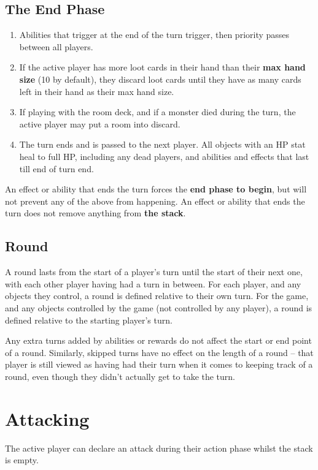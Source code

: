 \documentclass[a4paper, twoside]{report} %
\begin{document}
    \section{The End Phase}
    \begin{enumerate}
        \item Abilities that trigger at the end of the turn trigger, then priority passes between all players.
        \item If the active player has more loot cards in their hand than their \textbf{max hand size} (10 by default), they discard loot cards until they have as many cards left in their hand as their max hand size.
        \item If playing with the room deck, and if a monster died during the turn, the active player may put a room into discard.
        \item The turn ends and is passed to the next player. All objects with an HP stat heal to full HP, including any dead players, and abilities and effects that last till end of turn end.
    \end{enumerate}
    An effect or ability that ends the turn forces the \textbf{end phase to begin}, but will not prevent any of the above from happening. An effect or ability that ends the turn does not remove anything from \textbf{the stack}.

    \section{Round}
    A round lasts from the start of a player’s turn until the start of their next one, with each other player having had a turn in between. For each player, and any objects they control, a round is defined relative to their own turn. For the game, and any objects controlled by the game (not controlled by any player), a round is defined relative to the starting player’s turn.

    Any extra turns added by abilities or rewards do not affect the start or end point of a round. Similarly, skipped turns have no effect on the length of a round – that player is still viewed as having had their turn when it comes to keeping track of a round, even though they didn’t actually get to take the turn.

    \chapter{Attacking}
    \label{attacking}
    The active player can declare an attack during their action phase whilst the stack is empty.
\end{document}
